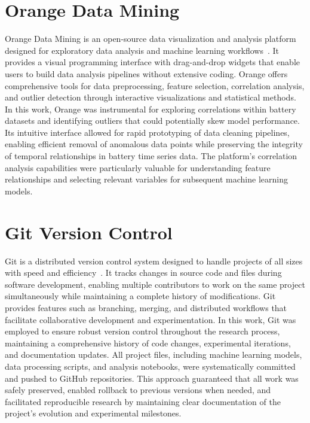 \section{Orange Data Mining}
Orange Data Mining is an open-source data visualization and analysis platform designed for exploratory data analysis and machine learning workflows~\cite{noauthor_biolaborange3_nodate}. It provides a visual programming interface with drag-and-drop widgets that enable users to build data analysis pipelines without extensive coding. Orange offers comprehensive tools for data preprocessing, feature selection, correlation analysis, and outlier detection through interactive visualizations and statistical methods. In this work, Orange was instrumental for exploring correlations within battery datasets and identifying outliers that could potentially skew model performance. Its intuitive interface allowed for rapid prototyping of data cleaning pipelines, enabling efficient removal of anomalous data points while preserving the integrity of temporal relationships in battery time series data. The platform's correlation analysis capabilities were particularly valuable for understanding feature relationships and selecting relevant variables for subsequent machine learning models.

\section{Git Version Control}
Git is a distributed version control system designed to handle projects of all sizes with speed and efficiency~\cite{noauthor_git_nodate}. It tracks changes in source code and files during software development, enabling multiple contributors to work on the same project simultaneously while maintaining a complete history of modifications. Git provides features such as branching, merging, and distributed workflows that facilitate collaborative development and experimentation. In this work, Git was employed to ensure robust version control throughout the research process, maintaining a comprehensive history of code changes, experimental iterations, and documentation updates. All project files, including machine learning models, data processing scripts, and analysis notebooks, were systematically committed and pushed to GitHub repositories. This approach guaranteed that all work was safely preserved, enabled rollback to previous versions when needed, and facilitated reproducible research by maintaining clear documentation of the project's evolution and experimental milestones.

